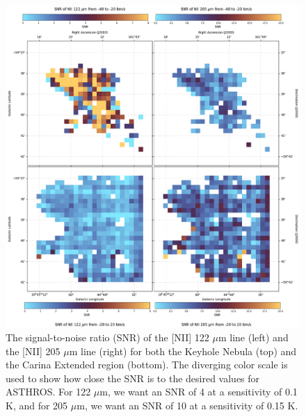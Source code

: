 \begin{figure}
    \centering
    \includegraphics[width=.9\textwidth]{figs/carina/snr.png}
    \caption[SNR of the {[}NII{]} 122 $\mu$m and 205 $\mu$m Lines in the Carina Nebula]{
        The signal-to-noise ratio (SNR) of the [NII] 122 $\mu$m line (left) and the [NII] 205 $\mu$m line (right) for both the Keyhole Nebula (top) and the Carina Extended region (bottom).
        The diverging color scale is used to show how close the SNR is to the desired values for ASTHROS.
        For 122 $\mu$m, we want an SNR of 4 at a sensitivity of 0.1 K, and for 205 $\mu$m, we want an SNR of 10 at a sensitivity of 0.15 K.
        }
    \label{carina/fig:snr}
\end{figure}

